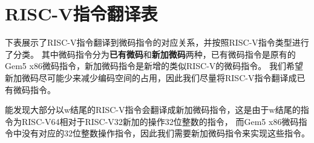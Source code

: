 \chapter{RISC-V指令翻译表}

下表展示了RISC-V指令翻译到微码指令的对应关系，并按照RISC-V指令类型进行了分类。
其中微码指令分为\textbf{已有微码}和\textbf{新加微码}两种，已有微码指令是原有的Gem5 x86微码指令，新加微码指令是新增的类似RISC-V的微码指令。
我们希望新加微码尽可能少来减少编码空间的占用，因此我们尽量将RISC-V指令翻译成已有微码指令。

能发现大部分以w结尾的RISC-V指令会翻译成新加微码指令，这是由于w结尾的指令为RISC-V64相对于RISC-V32新加的操作32位整数的指令，
而Gem5 x86微码指令中没有对应的32位整数操作指令，因此我们需要新加微码指令来实现这些指令。





